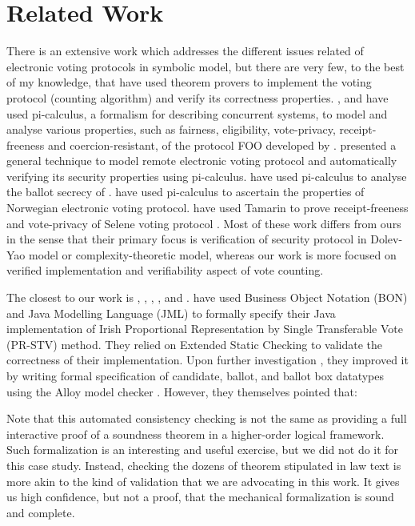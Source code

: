 \section{Related Work}
 There is an extensive work which 
 addresses the different issues related of electronic voting protocols  in symbolic model, 
 but there are very few, to the best of my knowledge, 
 that have used theorem provers to implement the voting protocol (counting algorithm)
 and verify its correctness properties. 
 \citep{10.1007/978-3-540-31987-0_14}, and  \citep{Delaune2010} have used pi-calculus, a formalism for describing concurrent systems,
 to model and analyse various properties, such as fairness, eligibility, vote-privacy, receipt-freeness and 
 coercion-resistant,  
 of the protocol FOO developed by \citep{10.1007/3-540-57220-1_66}.  \citep{Backes:2008:AVR:1380848.1381255}
 presented a general technique to model  remote electronic 
 voting protocol and automatically verifying  its security properties using pi-calculus. 
 \citep{5992139} have used pi-calculus to analyse the ballot secrecy of \citep{Helios:2016:HVS}.
 \citep{10.1007/978-3-642-28641-4_7} have used pi-calculus to ascertain the properties of 
 Norwegian electronic voting protocol.
 \citep{10.1007/978-3-319-68687-5_7} have used Tamarin  to prove receipt-freeness 
 and vote-privacy of Selene voting protocol \citep{Selene}.  Most of these work differs from ours
 in the sense that their primary focus is verification of security protocol in  
 Dolev-Yao model or  complexity-theoretic model, whereas our work is 
 more focused on verified implementation and  verifiability  aspect of vote counting.

 The closest to our work is \citep{Cochran:2010:VFS} \citep{DeYoung:2012:LLV}, \citep{Pattinson:2015:VCM}, \citep{Pattinson:2016:MSP},
 \citep{Verity:2017:FVI:3014812.3014845}, and \citep{Ghale:2017:FVS}. \citep{Cochran:2010:VFS} have used
 Business Object Notation (BON) and Java Modelling Language (JML) to formally specify their 
 Java implementation of  Irish Proportional  Representation  by  Single  Transferable  Vote  (PR-STV) 
 method.  They relied on Extended Static Checking to validate the correctness of their 
 implementation. Upon further investigation \citep{Cochran:2013:FMB}, they improved it 
 by writing formal specification of  candidate, ballot, and ballot box datatypes 
 using the Alloy model checker \citep{10.1145/505145.505149}. However, they themselves pointed that:
 \begin{displayquote}
 Note that this automated consistency checking is not the same as providing a 
 full interactive proof of a soundness theorem in a higher-order logical framework.
 Such formalization is an interesting and useful exercise, but we did not do it for this 
 case study. Instead, checking the dozens of theorem stipulated in law text is more 
 akin to the kind of validation that we are advocating in this work. 
 It gives us high confidence, but not a proof, that the mechanical formalization is
  sound and complete.
  \end{displayquote}
 
